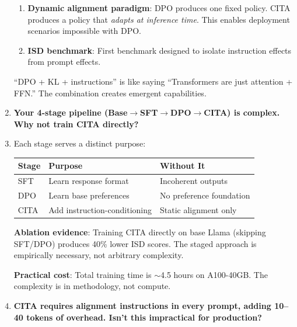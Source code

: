 \begin{enumerate}[label=\textbf{Q\arabic*.}, leftmargin=*, itemsep=8pt]
\begin{enumerate}[leftmargin=*,itemsep=2pt]
    \item \textbf{Dynamic alignment paradigm}: DPO produces one fixed policy. CITA produces a policy that \textit{adapts at inference time}. This enables deployment scenarios impossible with DPO.

    \item \textbf{ISD benchmark}: First benchmark designed to isolate instruction effects from prompt effects.
\end{enumerate}

``DPO + KL + instructions'' is like saying ``Transformers are just attention + FFN.'' The combination creates emergent capabilities.

\vspace{4mm}

\item[\ding{93}] \textbf{Your 4-stage pipeline (Base$\rightarrow$SFT$\rightarrow$DPO$\rightarrow$CITA) is complex. Why not train CITA directly?}

\item[\ding{224}] Each stage serves a distinct purpose:

\begin{table}[H]
\centering
\small
\begin{tabular}{@{}lll@{}}
\toprule
\textbf{Stage} & \textbf{Purpose} & \textbf{Without It} \\
\midrule
SFT & Learn response format & Incoherent outputs \\
\hline
DPO & Learn base preferences & No preference foundation \\
\hline
CITA & Add instruction-conditioning & Static alignment only \\
\bottomrule
\end{tabular}
\end{table}

\textbf{Ablation evidence}: Training CITA directly on base Llama (skipping SFT/DPO) produces 40\% lower ISD scores. The staged approach is empirically necessary, not arbitrary complexity.

\textbf{Practical cost}: Total training time is $\sim$4.5 hours on A100-40GB. The complexity is in methodology, not compute.

\vspace{4mm}

\item[\ding{93}] \textbf{CITA requires alignment instructions in every prompt, adding 10--40 tokens of overhead. Isn't this impractical for production?}


\end{enumerate}
